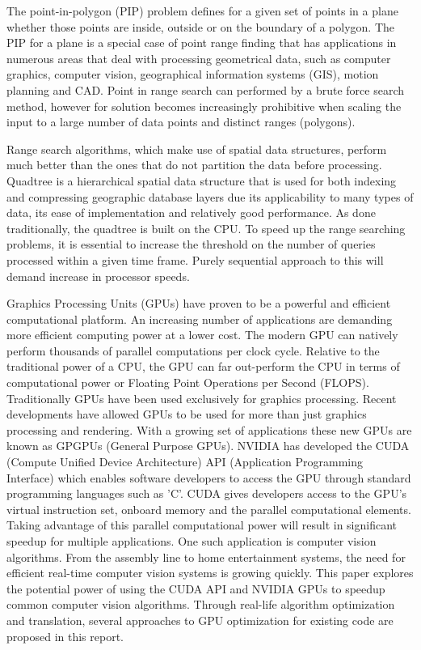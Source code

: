 %
%
%
%
%

The point-in-polygon (PIP) problem defines for a given set of points
in a plane whether those points are inside, outside or on the
boundary of a polygon. The PIP for a plane is a special case of point
range finding that has applications in numerous areas that deal with
processing geometrical data, such as computer graphics, computer
vision, geographical information systems (GIS), motion planning and
CAD. Point in range search can performed by a brute force
search method, however for solution becomes increasingly prohibitive
when scaling the input to a large number of data points and distinct
ranges (polygons).

Range search algorithms, which make use of spatial data structures,
perform much better than the ones that do not partition the data
before processing. Quadtree is a hierarchical spatial data structure
that is used for both indexing and compressing geographic database
layers due its applicability to many types of data, its ease of
implementation and relatively good performance. 
As done traditionally, the quadtree is built on the CPU. To speed up
the range searching problems, it is essential to increase the
threshold on the number of queries processed within a given time
frame. Purely sequential approach to this will demand increase in
processor speeds.  

Graphics Processing Units (GPUs) have proven to be
a powerful and efficient computational platform. An increasing number
of applications are demanding more efficient computing power at a
lower cost.  The modern GPU can natively perform thousands of parallel
computations per clock cycle.  Relative to the traditional power of a
CPU, the GPU can far out-perform the CPU in terms of computational
power or Floating Point Operations per Second (FLOPS). Traditionally
GPUs have been used exclusively for graphics processing. Recent
developments have allowed GPUs to be used for more than just graphics
processing and rendering. With a growing set of applications these
new GPUs are known as GPGPUs (General Purpose GPUs).
NVIDIA\textsuperscript{\textregistered} has developed the CUDA 
(Compute Unified Device Architecture) API (Application Programming
Interface) which enables software developers to access the GPU through
standard programming languages such as 'C'.  CUDA gives developers
access to the GPU's virtual instruction set, onboard memory and the
parallel computational elements.  Taking advantage of this parallel
computational power will result in significant speedup for multiple
applications.  One such application is computer vision algorithms.
From the assembly line to home entertainment systems, the need for
efficient real-time computer vision systems is growing quickly.  This
paper explores the potential power of using the CUDA API and
NVIDIA\textsuperscript{\textregistered} GPUs to speedup common
computer vision algorithms.  Through real-life algorithm optimization
and translation, several approaches to GPU optimization for existing
code are proposed in this report.

